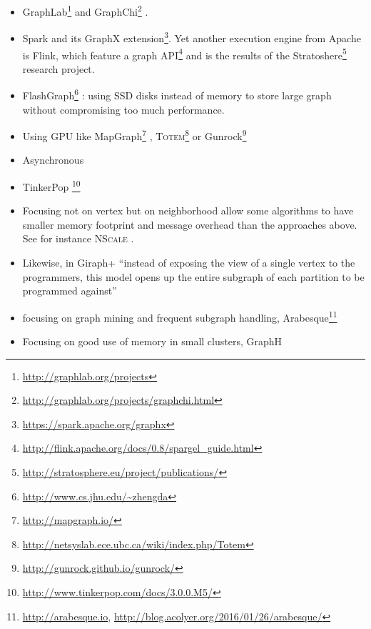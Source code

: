 \begin{itemize}
	\item
		GraphLab\footnote{\href{http://graphlab.org/projects/source.html}{http://graphlab.org/projects}}%
		\autocites{Low2010}{Gonzalez2012}{Low2012}{GraphLab13Low} and
		GraphChi\footnote{\href{http://graphlab.org/projects/graphchi.html}{http://graphlab.org/projects/graphchi.html}}
		\autocite{Kyrola2012}.
	\item
		Spark \autocite{Zaharia2010} and its GraphX
		extension\footnote{\href{https://spark.apache.org/graphx}{https://spark.apache.org/graphx}}.
		Yet another execution engine from Apache is Flink,  which feature a
		graph
		API\footnote{\href{http://flink.apache.org/docs/0.8/spargel_guide.html}%
			{http://flink.apache.org/docs/0.8/spargel\_guide.html}} and is the
		results of the Stratoshere\footnote{\href{http://stratosphere.eu/project/publications/}%
			{http://stratosphere.eu/project/publications/}} research project.
	\item FlashGraph\footnote{\href{http://www.cs.jhu.edu/~zhengda/\#FlashGraph}%
			{\url{http://www.cs.jhu.edu/~zhengda}}} \autocite{FlashGraph14}:
		using SSD disks instead of memory to store large graph without
		compromising too much performance.
	\item Using GPU like MapGraph\footnote{\href{http://mapgraph.io/}{http://mapgraph.io/}}
		\autocite{Fu2014},
		\textsc{Totem}\footnote{\href{http://netsyslab.ece.ubc.ca/wiki/index.php/Totem}%
			{http://netsyslab.ece.ubc.ca/wiki/index.php/Totem}}
		\autocite{Gharaibeh2013} or
		Gunrock\footnote{\href{http://gunrock.github.io/gunrock/}%
			{http://gunrock.github.io/gunrock/}} \autocite{Gunrock15}
	\item Asynchronous \autocite{Wang2013}
	\item TinkerPop \footnote{\href{http://www.tinkerpop.com/docs/3.0.0.M5/}%
			{http://www.tinkerpop.com/docs/3.0.0.M5/}}
	\item Focusing not on vertex but on neighborhood allow some algorithms to
		have smaller memory footprint and message overhead than the approaches
		above. See for instance \textsc{NScale} \autocite{Quamar2014}.
	\item Likewise, in Giraph+ \autocite{Tian2013} \enquote{instead of
		exposing the view of a single vertex to the programmers, this
		model opens up the entire subgraph of each partition to be
		programmed against}
	\item focusing on graph mining and frequent subgraph handling,
		Arabesque\footnote{\url{http://arabesque.io},
		\url{http://blog.acolyer.org/2016/01/26/arabesque/}}\autocite{Teixeira2015}
	\item Focusing on good use of memory in small clusters,
		GraphH\autocite{GraphHybrid17}
\end{itemize}

